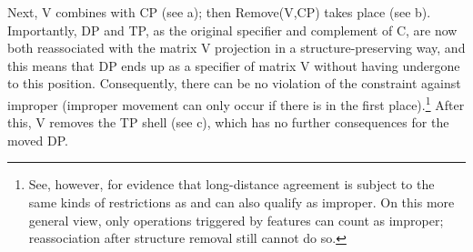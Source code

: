 \documentclass[output=paper]{langsci/langscibook}
\begin{document}
Next, V combines with CP (see a); then Remove(V,CP) takes place
(see b). Importantly, DP and TP, as the original specifier and
complement of C, are now both reassociated with the matrix V projection in a
structure-preserving way, and this means that DP ends up as a specifier of
matrix V without having undergone  to this position. Consequently,
there can be no violation of the constraint against improper  (improper
movement can only occur if there is  in the first place).\footnote{See,
    however, \cite{Keine:16} for evidence that long-distance
    agreement is
    subject to the same kinds of restrictions as  and can also qualify
    as improper. On this more general view, only operations triggered by
features can count as improper; reassociation after structure removal still
cannot do so.} After this, V removes the TP shell (see c), which
has no further consequences for the moved DP.
\end{document}

